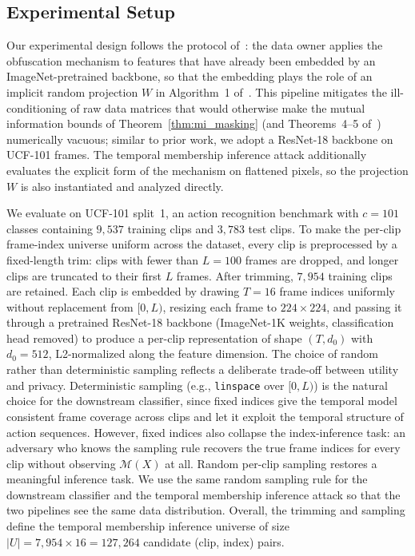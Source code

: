 \documentclass[sigconf,anonymous, review]{acmart}
\begin{document}
\subsection{Experimental Setup}
\label{subsec:exp_setup}

Our experimental design follows the protocol of~\cite{xiao2024formal}: the data owner applies the obfuscation mechanism to features that have already been embedded by an ImageNet-pretrained backbone, so that the embedding plays the role of an implicit random projection $W$ in Algorithm~1 of~\cite{xiao2024formal}. This pipeline mitigates the ill-conditioning of raw data matrices that would otherwise make the mutual information bounds of Theorem~\ref{thm:mi_masking} (and Theorems~4--5 of~\cite{xiao2024formal}) numerically vacuous; similar to prior work, we adopt a ResNet-18 backbone on UCF-101 frames. The temporal membership inference attack additionally evaluates the explicit form of the mechanism on flattened pixels, so the projection $W$ is also instantiated and analyzed directly.

We evaluate on UCF-101 split~1, an action recognition benchmark with $c = 101$ classes containing $9{,}537$ training clips and $3{,}783$ test clips. To make the per-clip frame-index universe uniform across the dataset, every clip is preprocessed by a fixed-length trim: clips with fewer than $L = 100$ frames are dropped, and longer clips are truncated to their first $L$ frames. After trimming, $7{,}954$ training clips are retained.  Each clip is embedded by drawing $T = 16$ frame indices uniformly without replacement from $[0, L)$, resizing each frame to $224 \times 224$, and passing it through a pretrained ResNet-18 backbone (ImageNet-1K weights, classification head removed) to produce a per-clip representation of shape $(T, d_0)$ with $d_0 = 512$, L2-normalized along the feature dimension. The choice of random rather than deterministic sampling reflects a deliberate trade-off between utility and privacy. Deterministic sampling (e.g., \texttt{linspace} over $[0, L)$) is the natural choice for the downstream classifier, since fixed indices give the temporal model consistent frame coverage across clips and let it exploit the temporal structure of action sequences. However, fixed indices also collapse the index-inference task: an adversary who knows the sampling rule recovers the true frame indices for every clip without observing $\mathcal{M}(X)$ at all. Random per-clip sampling restores a meaningful inference task. We use the same random sampling rule for the downstream classifier and the temporal membership inference attack so that the two pipelines see the same data distribution. Overall, the trimming and sampling define the temporal membership inference universe of size $|U| = 7{,}954 \times 16 = 127{,}264$ candidate (clip, index) pairs.
\end{document}

